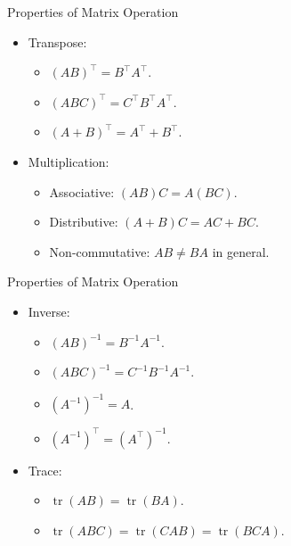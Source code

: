 \documentclass[10pt]{beamer}
\begin{document}
\begin{frame}{Properties of Matrix Operation}
    \begin{itemize}
        \item Transpose:
            \begin{itemize}
                \item $(AB)^\top = B^\top A^\top$. 
                \item $(ABC)^\top = C^\top B^\top A^\top$.
                \item $(A + B)^\top = A^\top + B^\top$. 
            \end{itemize}
        \item Multiplication:
            \begin{itemize}
                \item Associative: $(AB)C = A(BC)$.
                \item Distributive: $(A + B)C = AC + BC$. 
                \item Non-commutative: $AB \ne BA$ in general. 
            \end{itemize}
    \end{itemize}
\end{frame}

\begin{frame}{Properties of Matrix Operation}
\begin{itemize}
    \item Inverse:
        \begin{itemize}
                \item $(AB)^{-1} = B^{-1}A^{-1}$. 
                \item $(ABC)^{-1} = C^{-1}B^{-1}A^{-1}$. 
                \item $(A^{-1})^{-1} = A$.
                \item $(A^{-1})^\top = (A^\top)^{-1}$. 
        \end{itemize}
    \item Trace:
        \begin{itemize}
                \item $\operatorname{tr}(AB) = \operatorname{tr}(BA)$.
                \item $\operatorname{tr}(ABC) = \operatorname{tr}(CAB) = \operatorname{tr}(BCA)$.
        \end{itemize}
\end{itemize}
\end{frame}
\end{document}
